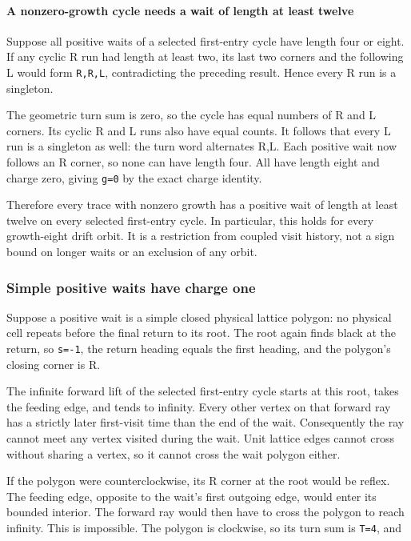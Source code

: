 \documentclass[11pt,letterpaper]{article}
\theoremstyle{plain}
\theoremstyle{definition}
\begin{document}
\begin{NoHyper}
\paragraph{A nonzero-growth cycle needs a wait of length at least twelve}

Suppose all positive waits of a selected first-entry cycle have length four or eight. If any cyclic R run had length at least two, its last two corners and the following L would form \texttt{R,R,L}, contradicting the preceding result. Hence every R run is a singleton.

The geometric turn sum is zero, so the cycle has equal numbers of R and L corners. Its cyclic R and L runs also have equal counts. It follows that every L run is a singleton as well: the turn word alternates R,L. Each positive wait now follows an R corner, so none can have length four. All have length eight and charge zero, giving \texttt{g=0} by the exact charge identity.

Therefore every trace with nonzero growth has a positive wait of length at least twelve on every selected first-entry cycle. In particular, this holds for every growth-eight drift orbit. It is a restriction from coupled visit history, not a sign bound on longer waits or an exclusion of any orbit.

\subsubsection{Simple positive waits have charge one}

Suppose a positive wait is a simple closed physical lattice polygon: no physical cell repeats before the final return to its root. The root again finds black at the return, so \texttt{s=-1}, the return heading equals the first heading, and the polygon's closing corner is R.

The infinite forward lift of the selected first-entry cycle starts at this root, takes the feeding edge, and tends to infinity. Every other vertex on that forward ray has a strictly later first-visit time than the end of the wait. Consequently the ray cannot meet any vertex visited during the wait. Unit lattice edges cannot cross without sharing a vertex, so it cannot cross the wait polygon either.

If the polygon were counterclockwise, its R corner at the root would be reflex. The feeding edge, opposite to the wait's first outgoing edge, would enter its bounded interior. The forward ray would then have to cross the polygon to reach infinity. This is impossible. The polygon is clockwise, so its turn sum is \texttt{T=4}, and


\end{NoHyper}
\end{document}
